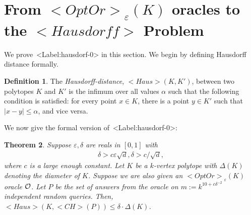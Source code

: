 \documentclass[11pt,letterpaper]{article}
\def\mathsf#1{<#1>}%
\def\xspace{}%
\def\Cref#1{<Label:#1>}%
\newtheorem{theorem}{Theorem}[section]
\theoremstyle{definition}
\newtheorem{defn}[theorem]{Definition}
\theoremstyle{remark}
\newcommand{\CH}{{\mathsf {CH}}}
\newcommand{\Haus}{{\mathsf{Haus}}}
\newcommand{\Hausdorf}{\mathsf {Hausdorff}\xspace }
\newcommand{\opto}{{\mathsf{OptOr}}}
\begin{document}
\section{From $\opto_\varepsilon(K)$ oracles to the $\Hausdorf$ Problem}
\label{sec:haus}
We prove~\Cref{hausdorf-0} in this section. We begin by defining Hausdorff distance formally. 



\begin{defn}
\label{defn:Haus}
    The {\em Hausdorff-distance}, $\Haus(K,K')$, between two polytopes $K$ and $K'$ is the infimum over all values $\alpha$ such that the following condition is satisfied: for every point $x \in K$, there is a point $y \in K'$ such that $|x-y| \leq \alpha$, and vice versa.
\end{defn}

%
We now give the formal version of~\Cref{hausdorf-0}:
\begin{theorem}\label{upper-bound-3}
Suppose $\varepsilon,\delta$ are reals in $[0,1]$ with 
\begin{align}
\label{eq:deltacond}
    \delta > c \varepsilon \sqrt{d}, \delta > c/\sqrt{d}, 
\end{align}
where $c$ is a large enough constant. 
  Let $K$ be a $k$-vertex polytope with $\Delta(K)$ denoting the diameter of $K$. Suppose we are also given an  $ \opto_\varepsilon(K)$ oracle $\cal O$.  
    Let 
  $P$ be the set of answers from the oracle on $m:= k^{10+c \delta^{-2}}$ independent random queries. Then, $\Haus(K, \CH(P)) \leq \delta \cdot \Delta(K)$. 
\end{theorem}
\end{document}
